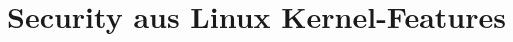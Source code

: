 \documentclass[../main.tex]{subfiles}
\begin{document}









\chapter{Security aus Linux Kernel-Features}
\label{secLinux}
\end{document}
